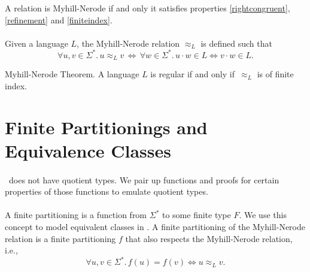             \begin{definition}
                \label{MN_relation}
                A relation is Myhill-Nerode if and only it satisfies properties \ref{rightcongruent}, \ref{refinement} and \ref{finiteindex}.
            \end{definition}


            \paragraph{} Given a language $L$, the Myhill-Nerode relation $\approx_L$ is defined such that 
            \[
                \forall u, v \in \Sigma^*. \,
                u \approx_L v \, \Longleftrightarrow \, 
                \forall w \in \Sigma^*.\, u \cdot w \in L \Leftrightarrow v \cdot w \in L.
                \]


                \begin{theorem}{Myhill-Nerode Theorem.}
                    \label{MN}
                    A language $L$ is regular if and only if $\,\approx_L$ is of finite index.
                \end{theorem}

                \section{Finite Partitionings and Equivalence Classes}

                \paragraph{}
                \coq\ does not have quotient types. 
                We pair up functions and proofs for certain properties of those functions to emulate quotient types.

                \paragraph{} 
                A finite partitioning is a function from $\Sigma^*$ to some finite type $F$. 
                We use this concept to model equivalent classes in \coq. 
                A finite partitioning of the Myhill-Nerode relation is a finite partitioning $f$ that also respects the Myhill-Nerode relation, i.e.,
                \[
                    \forall u, v \in \Sigma^*. \,
                    f(u) = f(v) \Leftrightarrow u \approx_L v.
                    \]


